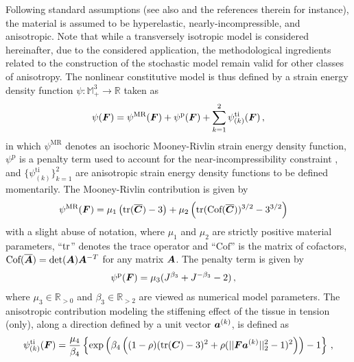Following standard assumptions \cite{Holzapfel2000,Gasser2006,Holzapfel2010,Holzapfel2015,Holzapfel2017} (see also \cite{Brinkhues2013ModelingAS} and the references therein for instance), the material is assumed to be hyperelastic, nearly-incompressible, and anisotropic. Note that while a transversely isotropic model is considered hereinafter, due to the considered application, the methodological ingredients related to the construction of the stochastic model remain valid for other classes of anisotropy. The nonlinear constitutive model is thus defined by a strain energy density function $\psi:\mathbb{M}^3_+ \to \mathbb{R}$ taken as
\begin{align}
    \psi(\boldsymbol{F}) = \psi^{\text{MR}}(\boldsymbol{F}) + \psi^\text{p}(\boldsymbol{F}) + \sum_{k=1}^{2} \psi_{(k)}^\text{ti}(\boldsymbol{F})\,, \label{eq: strain energy density function}
\end{align}
in which $\psi^{\text{MR}}$ denotes an isochoric Mooney-Rivlin strain energy density function, $\psi^\text{p}$ is a penalty term used to account for the near-incompressibility constraint \cite{charrier1988existence}, and $\{\psi_{(k)}^\text{ti}\}_{k = 1}^2$ are anisotropic strain energy density functions to be defined momentarily. The Mooney-Rivlin contribution is given by
\begin{align}
    \psi^{\text{MR}}(\boldsymbol{F}) &= \mu_1 \left( \textnormal{tr}(\overline{\boldsymbol{C}}) - 3 \right) + \mu_2 \left( \textnormal{tr}(\text{Cof}(\overline{\boldsymbol{C}}))^{3/2} - 3^{3/2}\right) \label{eq: MR} 
\end{align}
with a slight abuse of notation, where $\mu_1$ and $\mu_2$ are strictly positive material parameters, ``$\textnormal{tr}$'' denotes the trace operator and ``$\text{Cof}$'' is the matrix of cofactors, $\text{Cof}(\overline{\boldsymbol{A}}) = \det(\boldsymbol{A})\boldsymbol{A}^{-T}$ for any matrix $\boldsymbol{A}$. The penalty term is given by
\begin{align}
    \psi^\text{p}(\boldsymbol{F}) & = \mu_3 (J^{\beta_3}+J^{-\beta_3} - 2)\,, \label{eq: penalty}
\end{align}
where $\mu_3 \in \mathbb{R}_{> 0}$ and $\beta_3 \in \mathbb{R}_{> 2}$ are viewed as numerical model parameters. The anisotropic contribution modeling the stiffening effect of the tissue in tension (only), along a direction defined by a unit vector $\boldsymbol{a}^{(k)}$, is defined as
\begin{equation}
    \psi_{(k)}^\text{ti}(\boldsymbol{F}) = \frac{\mu_4}{\beta_4} \left\{ \exp \left(\beta_4 \left( (1-\rho)(\textnormal{tr}(\boldsymbol{C})-3)^2 + \rho (\vert \vert \boldsymbol{F} \boldsymbol{a}^{(k)} \vert \vert ^2_2 - 1)^2 \right) \right) - 1\right\}\,, \label{eq: psi tissue-artery}
\end{equation}
